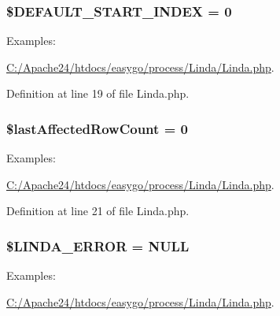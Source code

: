 \subsubsection[{\$\+D\+E\+F\+A\+U\+L\+T\+\_\+\+S\+T\+A\+R\+T\+\_\+\+I\+N\+D\+E\+X}]{\setlength{\rightskip}{0pt plus 5cm}\$D\+E\+F\+A\+U\+L\+T\+\_\+\+S\+T\+A\+R\+T\+\_\+\+I\+N\+D\+E\+X = 0\hspace{0.3cm}{\ttfamily [protected]}}\label{class_linda_a803cce07cc3e3f9937b6e5faba4100fe}
\begin{Desc}
\item[Examples\+: ]\par
\hyperlink{_c_1_2_apache24_2htdocs_2easygo_2process_2_linda_2_linda_8php-example}{C\+:/\+Apache24/htdocs/easygo/process/\+Linda/\+Linda.\+php}.\end{Desc}


Definition at line 19 of file Linda.\+php.

\hypertarget{class_linda_a038edab690e03aff9c70a1f63c06f27e}{}
\subsubsection[{\$last\+Affected\+Row\+Count}]{\setlength{\rightskip}{0pt plus 5cm}\$last\+Affected\+Row\+Count = 0\hspace{0.3cm}{\ttfamily [protected]}}\label{class_linda_a038edab690e03aff9c70a1f63c06f27e}
\begin{Desc}
\item[Examples\+: ]\par
\hyperlink{_c_1_2_apache24_2htdocs_2easygo_2process_2_linda_2_linda_8php-example}{C\+:/\+Apache24/htdocs/easygo/process/\+Linda/\+Linda.\+php}.\end{Desc}


Definition at line 21 of file Linda.\+php.

\hypertarget{class_linda_ab7d7da38a7a04e1f95bc46697f8d80e3}{}
\subsubsection[{\$\+L\+I\+N\+D\+A\+\_\+\+E\+R\+R\+O\+R}]{\setlength{\rightskip}{0pt plus 5cm}\$L\+I\+N\+D\+A\+\_\+\+E\+R\+R\+O\+R = N\+U\+L\+L}\label{class_linda_ab7d7da38a7a04e1f95bc46697f8d80e3}
\begin{Desc}
\item[Examples\+: ]\par
\hyperlink{_c_1_2_apache24_2htdocs_2easygo_2process_2_linda_2_linda_8php-example}{C\+:/\+Apache24/htdocs/easygo/process/\+Linda/\+Linda.\+php}.\end{Desc}


